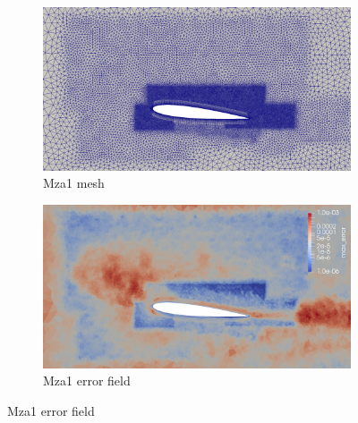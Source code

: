 \begin{figure}[H]
\begin{subfigure}[b]{0.475\textwidth}
	\centering
	\includegraphics[width=1\textwidth]{figures/zonal_adapt_results/Mesh_and_error_plots/Mza1_inplane.png}
	\caption{Mza1 mesh}
	\label{fig:zonal_Mza1_mesh}
\end{subfigure}
\begin{subfigure}[b]{0.475\textwidth}
	\centering
	\includegraphics[width=1\textwidth]{figures/zonal_adapt_results/Mesh_and_error_plots/Mza1_error.png}
	\caption{Mza1 error field}
	\label{fig:zonal_Mza1_error}
\end{subfigure}



\end{figure}
